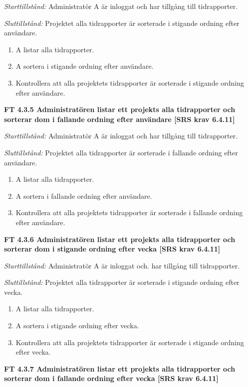 \documentclass[a4paper]{article}
\begin{document}
\emph{Starttillstånd:} Administratör A är inloggat och har tillgång till tidrapporter.

\emph{Sluttillstånd:} Projektet alla tidrapporter är sorterade i stigande ordning efter användare.

\begin{enumerate}
\item A listar alla tidrapporter.
\item A sortera i stigande ordning efter användare.
\item Kontrollera att alla projektets tidrapporter är sorterade i stigande ordning efter användare.
\end{enumerate}

\textbf{FT 4.3.5 Administratören listar ett projekts alla tidrapporter och sorterar dom i fallande ordning efter användare [SRS krav 6.4.11]}

\emph{Starttillstånd:} Administratör A är inloggat och har tillgång till tidrapporter.

\emph{Sluttillstånd:} Projektet alla tidrapporter är sorterade i fallande ordning efter användare.

\begin{enumerate}
\item A listar alla tidrapporter.
\item A sortera i fallande ordning efter användare.
\item Kontrollera att alla projektets tidrapporter är sorterade i fallande ordning efter användare.
\end{enumerate}

\textbf{FT 4.3.6 Administratören listar ett projekts alla tidrapporter och sorterar dom i stigande ordning efter vecka [SRS krav 6.4.11]}

\emph{Starttillstånd:} Administratör A är inloggat och. har tillgång till tidrapporter.

\emph{Sluttillstånd:} Projektet alla tidrapporter är sorterade i stigande ordning efter vecka.

\begin{enumerate}
\item A listar alla tidrapporter.
\item A sortera i stigande ordning efter vecka.
\item Kontrollera att alla projektets tidrapporter är sorterade i stigande ordning efter vecka.
\end{enumerate}

\textbf{FT 4.3.7 Administratören listar ett projekts alla tidrapporter och sorterar dom i fallande ordning efter vecka [SRS krav 6.4.11]}
\end{document}
